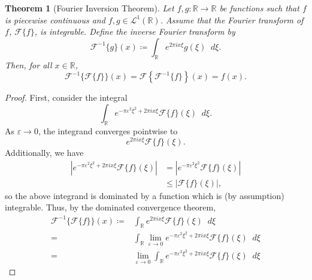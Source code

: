 \documentclass[a4paper]{article}
\newcommand*\diff{\mathop{}\!d} %
\newcommand{\R}{\mathbb{R}}
\newtheorem{theorem}{Theorem}
\theoremstyle{definition}
\begin{document}
\begin{theorem}[Fourier Inversion Theorem]
    Let $f, g \colon \R \to \R$ be functions such that $f$ is piecewise continuous and $f,g \in \mathcal{L}^1(\R)$.
    Assume that the Fourier transform of $f$, $\mathcal{F}\{f\}$, is integrable.
    Define the \emph{inverse Fourier transform} by
    \begin{equation}
        \mathcal{F}^{-1}\{g\}(x) \coloneq \int_\R e^{2\pi i x \xi} g(\xi) \diff \xi.
    \end{equation}
    Then, for all $x \in \R$,
    \begin{equation*}
        \mathcal{F}^{-1}\{\mathcal{F}\{f\}\}(x) = \mathcal{F}\left\{\mathcal{F}^{-1}\{f\}\right\}(x) = f(x).
    \end{equation*}
\end{theorem}
\begin{proof}
    First, consider the integral
    \begin{equation*}
        \int_\R e^{- \pi \varepsilon^2 \xi^2 + 2\pi i x \xi} \mathcal{F}\{f\}(\xi) \diff \xi.
    \end{equation*}
    As $\varepsilon \to 0$, the integrand converges pointwise to
    \begin{equation*}
        e^{2\pi i x \xi} \mathcal{F}\{f\}(\xi).
    \end{equation*}
    Additionally, we have
    \begin{align*}
        \left\lvert e^{- \pi \varepsilon^2 \xi^2 + 2\pi i x \xi} \mathcal{F}\{f\}(\xi) \right\rvert & = \left\lvert e^{- \pi \varepsilon^2 \xi^2} \mathcal{F}\{f\}(\xi) \right\rvert \\
                                                                                                    & \leq \lvert \mathcal{F}\{f\}(\xi) \rvert,
    \end{align*}
    so the above integrand is dominated by a function which is (by assumption) integrable.
    Thus, by the dominated convergence theorem,
    \begin{align*}
        \mathcal{F}^{-1}\{\mathcal{F}\{f\}\}(x) \coloneq & \int_\R e^{2\pi i x \xi} \mathcal{F}\{f\}(\xi) \diff \xi                                                       \\
        =                                                & \int_\R \lim_{\varepsilon \to 0}  e^{- \pi \varepsilon^2 \xi^2 + 2\pi i x \xi} \mathcal{F}\{f\}(\xi) \diff \xi \\
        =                                                & \lim_{\varepsilon \to 0} \int_\R e^{- \pi \varepsilon^2 \xi^2 + 2\pi i x \xi} \mathcal{F}\{f\}(\xi) \diff \xi

\end{align*}
\end{proof}
\end{document}
